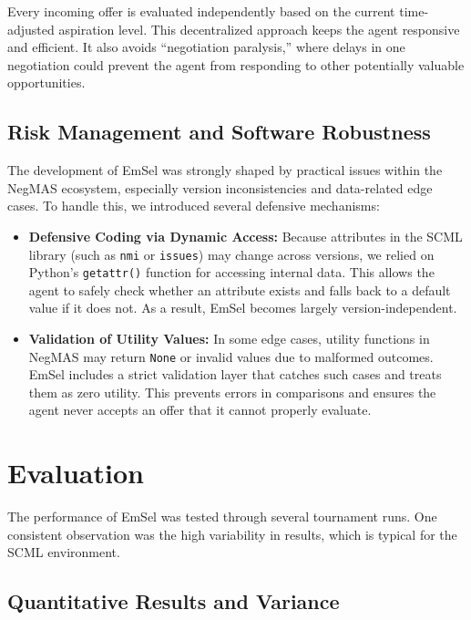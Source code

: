 \documentclass[a4paper,11pt]{article}
\begin{document}
	Every incoming offer is evaluated independently based on the current time-adjusted aspiration level. This decentralized approach keeps the agent responsive and efficient. It also avoids ``negotiation paralysis,'' where delays in one negotiation could prevent the agent from responding to other potentially valuable opportunities.
	
	\subsection{Risk Management and Software Robustness}
	
	The development of EmSel was strongly shaped by practical issues within the NegMAS ecosystem, especially version inconsistencies and data-related edge cases. To handle this, we introduced several defensive mechanisms:
	
	\begin{itemize}
		\item \textbf{Defensive Coding via Dynamic Access:} Because attributes in the SCML library (such as \texttt{nmi} or \texttt{issues}) may change across versions, we relied on Python's \texttt{getattr()} function for accessing internal data. This allows the agent to safely check whether an attribute exists and falls back to a default value if it does not. As a result, EmSel becomes largely version-independent.
		
		\item \textbf{Validation of Utility Values:} In some edge cases, utility functions in NegMAS may return \texttt{None} or invalid values due to malformed outcomes. EmSel includes a strict validation layer that catches such cases and treats them as zero utility. This prevents errors in comparisons and ensures the agent never accepts an offer that it cannot properly evaluate.
	\end{itemize}
	
	\section{Evaluation}
	
	The performance of EmSel was tested through several tournament runs. One consistent observation was the high variability in results, which is typical for the SCML environment.
	
	\subsection{Quantitative Results and Variance}
	
\end{document}
